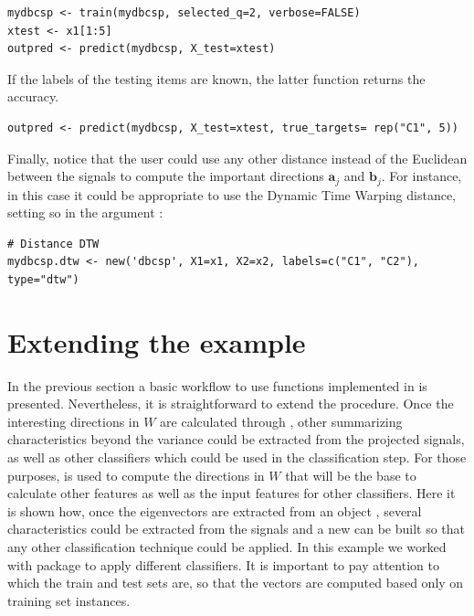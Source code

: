 \begin{verbatim}
mydbcsp <- train(mydbcsp, selected_q=2, verbose=FALSE)
xtest <- x1[1:5]
outpred <- predict(mydbcsp, X_test=xtest)
\end{verbatim}

If the labels of the testing items are known, the latter function returns the accuracy.

\begin{verbatim}
outpred <- predict(mydbcsp, X_test=xtest, true_targets= rep("C1", 5))
\end{verbatim}

Finally, notice that the user could use any other distance instead of the Euclidean between the signals to compute the important directions $\mathbf{a}_j$ and $\mathbf{b}_j$. For instance, in this case it could be appropriate to use the Dynamic Time Warping distance, setting so in the argument :
\begin{verbatim}
# Distance DTW
mydbcsp.dtw <- new('dbcsp', X1=x1, X2=x2, labels=c("C1", "C2"), type="dtw")
\end{verbatim}

\section{Extending the example}
 
In the previous section a basic workflow to use functions implemented in  is presented. Nevertheless, it is straightforward to extend the procedure. Once the interesting directions in $W$ are calculated through , other summarizing characteristics beyond the variance could be extracted from the projected signals, as well as other classifiers which could be used in the classification step. For those purposes,  is used to compute the directions in $W$ that will be the base to calculate other features as well as the input features for other classifiers. Here it is shown how, once the eigenvectors are extracted from an object , several characteristics could be extracted from the signals and a new  can be built so that any other classification technique could be applied. In this example we worked with  package to apply different classifiers.
It is important to pay attention to which the train and test sets are, so that the vectors are computed based only on training set instances.

